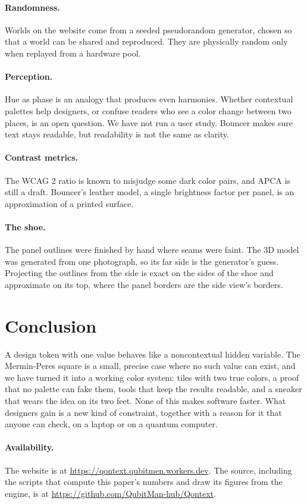 \documentclass[11pt,a4paper]{article}
\theoremstyle{qresult}
\begin{document}
\paragraph{Randomness.} Worlds on the website come from a seeded pseudorandom generator, chosen so that a world can be
shared and reproduced. They are physically random only when replayed from a hardware pool.

\paragraph{Perception.} Hue as phase is an analogy that produces even harmonies. Whether contextual palettes help
designers, or confuse readers who see a color change between two places, is an open question. We have not run a user
study. Bouncer makes sure text stays readable, but readability is not the same as clarity.

\paragraph{Contrast metrics.} The WCAG 2 ratio is known to misjudge some dark color pairs, and APCA is still a draft.
Bouncer's leather model, a single brightness factor per panel, is an approximation of a printed surface.

\paragraph{The shoe.} The panel outlines were finished by hand where seams were faint. The 3D model was generated
from one photograph, so its far side is the generator's guess. Projecting the outlines from the side is exact on the
sides of the shoe and approximate on its top, where the panel borders are the side view's borders.

\section{Conclusion}

A design token with one value behaves like a noncontextual hidden variable. The Mermin-Peres square is a small,
precise case where no such value can exist, and we have turned it into a working color system: tiles with two true
colors, a proof that no palette can fake them, tools that keep the results readable, and a sneaker that wears the
idea on its two feet. None of this makes software faster. What designers gain is a new kind of constraint, together
with a reason for it that anyone can check, on a laptop or on a quantum computer.

\paragraph{Availability.} The website is at \url{https://qontext.qubitmen.workers.dev}. The source, including the
scripts that compute this paper's numbers and draw its figures from the engine, is at
\url{https://github.com/QubitMan-hub/Qontext}.



\end{document}
